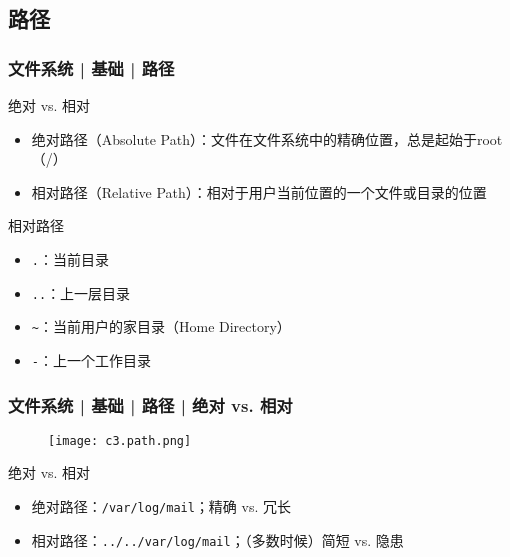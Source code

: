 \subsection{路径}
\begin{frame}[fragile]
  \frametitle{文件系统 | 基础 | \alert{路径}}
  \begin{block}{绝对 vs. 相对}
    \begin{itemize}
      \item 绝对路径（Absolute Path）：文件在文件系统中的精确位置，总是起始于root（/）
      \item 相对路径（Relative Path）：相对于用户当前位置的一个文件或目录的位置
    \end{itemize}
  \end{block}
  \pause
  \begin{block}{相对路径}
    \begin{itemize}
      \item \verb|.|：当前目录
      \item \verb|..|：上一层目录
      \item \verb|~|：当前用户的家目录（Home Directory）
      \item \verb|-|：上一个工作目录
    \end{itemize}
  \end{block}
\end{frame}

\begin{frame}[fragile]
  \frametitle{文件系统 | 基础 | 路径 | 绝对 vs. 相对}
  \begin{figure}
    \centering
    \texttt{[image: c3.path.png]}
  \end{figure}
  \pause
  \begin{block}{绝对 vs. 相对}
    \begin{itemize}[<+->]
      \item 绝对路径：\verb|/var/log/mail|；精确 vs. 冗长
      \item 相对路径：\verb|../../var/log/mail|；（多数时候）简短 vs. 隐患
    \end{itemize}
  \end{block}
\end{frame}

